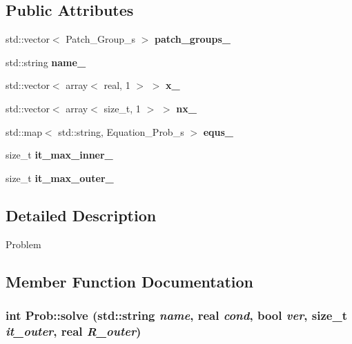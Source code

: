 \subsection*{Public Attributes}
\begin{DoxyCompactItemize}
\item 
\hypertarget{classProb_a63da8c35707c884a7f2960b18e8b5e30}{
std::vector$<$ Patch\_\-Group\_\-s $>$ {\bfseries patch\_\-groups\_\-}}
\label{classProb_a63da8c35707c884a7f2960b18e8b5e30}

\item 
\hypertarget{classProb_af34172c6eced00a603e92e0cf17e4953}{
std::string {\bfseries name\_\-}}
\label{classProb_af34172c6eced00a603e92e0cf17e4953}

\item 
\hypertarget{classProb_ac18ce288649f196b15137b88bfe374de}{
std::vector$<$ array$<$ real, 1 $>$ $>$ {\bfseries x\_\-}}
\label{classProb_ac18ce288649f196b15137b88bfe374de}

\item 
\hypertarget{classProb_a59f92ce7194950bf4c89d00af62c7b51}{
std::vector$<$ array$<$ size\_\-t, 1 $>$ $>$ {\bfseries nx\_\-}}
\label{classProb_a59f92ce7194950bf4c89d00af62c7b51}

\item 
\hypertarget{classProb_ac78ec4ce0542942cbfdb62e2737b149e}{
std::map$<$ std::string, Equation\_\-Prob\_\-s $>$ {\bfseries equs\_\-}}
\label{classProb_ac78ec4ce0542942cbfdb62e2737b149e}

\item 
\hypertarget{classProb_a4414250c2bd8f6aa6cfc9488c3993092}{
size\_\-t {\bfseries it\_\-max\_\-inner\_\-}}
\label{classProb_a4414250c2bd8f6aa6cfc9488c3993092}

\item 
\hypertarget{classProb_aa52011388c8c265ffc71c010a4b61f8f}{
size\_\-t {\bfseries it\_\-max\_\-outer\_\-}}
\label{classProb_aa52011388c8c265ffc71c010a4b61f8f}

\end{DoxyCompactItemize}


\subsection{Detailed Description}
Problem 

\subsection{Member Function Documentation}
\hypertarget{classProb_a35e6fe7ad3c45ef3b922f5212a039887}{
\subsubsection[{solve}]{\setlength{\rightskip}{0pt plus 5cm}int Prob::solve (std::string {\em name}, \/  real {\em cond}, \/  bool {\em ver}, \/  size\_\-t {\em it\_\-outer}, \/  real {\em R\_\-outer})}}
\label{classProb_a35e6fe7ad3c45ef3b922f5212a039887}


